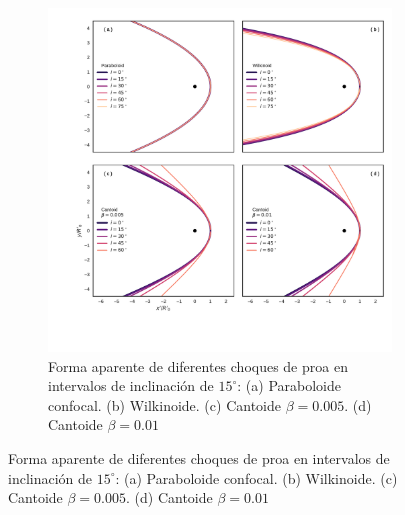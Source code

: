 \begin{figure}
\begin{figure}
  \centering
  \includegraphics[width=\linewidth]{./Figures/cantoid-apparent-shape}
  \caption{Forma aparente de diferentes choques de proa en intervalos de inclinación de $15^\circ$: (a) Paraboloide confocal. (b) Wilkinoide. (c) Cantoide $\beta=0.005$. (d) Cantoide $\beta=0.01$}
  \label{fig:apparent-cantoid}
\end{figure}


\end{figure}

